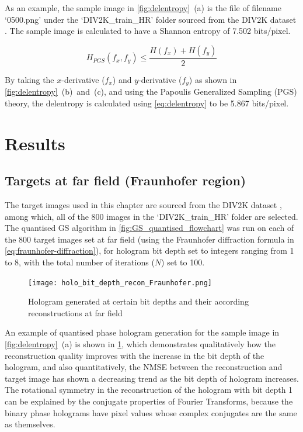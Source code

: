 	As an example, the sample image in \cref{fig:delentropy}~(a) is the file of filename `0500.png' under the `DIV2K\_train\_HR' folder sourced from the DIV2K dataset \cite{Agustsson2017}. The sample image is calculated to have a Shannon entropy of 7.502 bits/pixel.

	\begin{equation}
		H_{PGS}(f_x, f_y) \leq \frac{H(f_x) + H(f_y)}{2}
		\label{eq:delentropy}
	\end{equation}

	By taking the $x$-derivative ($f_x$) and $y$-derivative ($f_y$) as shown in \cref{fig:delentropy}~(b)~and~(c), and using the Papoulis Generalized Sampling (PGS) \cite{Papoulis1977} theory, the delentropy is calculated using \cref{eq:delentropy}\cite{Larkin2016} to be 5.867 bits/pixel.




\section{Results}
\subsection{Targets at far field (Fraunhofer region)} \label{sec:Fraunhofer_results}
	The target images used in this chapter are sourced from the DIV2K dataset \cite{Agustsson2017}, among which, all of the 800 images in the `DIV2K\_train\_HR' folder are selected. The quantised GS algorithm in \cref{fig:GS_quantised_flowchart} was run on each of the 800 target images set at far field (using the Fraunhofer diffraction formula in \cref{eq:fraunhofer-diffraction}), for hologram bit depth set to integers ranging from 1 to 8, with the total number of iterations ($N$) set to 100.

	\begin{figure} [H]
	   \begin{center}
	   \texttt{[image: holo\_bit\_depth\_recon\_Fraunhofer.png]}
	   \end{center}
	   \caption{\label{fig:holo_bit_depth_recon_Fraunhofer} Hologram generated at certain bit depths and their according reconstructions at far field}
	\end{figure}

	An example of quantised phase hologram generation for the sample image in \cref{fig:delentropy}~(a) is shown in \cref{fig:holo_bit_depth_recon_Fraunhofer}, which demonstrates qualitatively how the reconstruction quality improves with the increase in the bit depth of the hologram, and also quantitatively, the NMSE between the reconstruction and target image has shown a decreasing trend as the bit depth of hologram increases. The rotational symmetry in the reconstruction of the hologram with bit depth 1 can be explained by the conjugate properties of Fourier Transforms, because the binary phase holograms have pixel values whose complex conjugates are the same as themselves.


